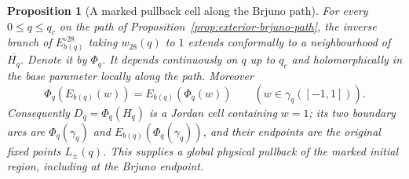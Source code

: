 \documentclass[11pt]{amsart}
\newtheorem{proposition}[theorem]{Proposition}
\theoremstyle{definition}
\begin{document}
\begin{proposition}[A marked pullback cell along the Brjuno path]
\label{prop:exterior-pullback-cell}
For every $0\le q\le q_c$ on the path of
Proposition~\ref{prop:exterior-brjuno-path}, the inverse branch of
$E_{b(q)}^{\circ28}$ taking $w_{28}(q)$ to $1$ extends conformally
to a neighbourhood of $\overline{H_q}$.  Denote it by $\Phi_q$.
It depends continuously on $q$ up to $q_c$ and holomorphically in
the base parameter locally along the path.  Moreover
\[
 \Phi_q(E_{b(q)}(w))=E_{b(q)}(\Phi_q(w))
 \qquad(w\in\gamma_q([-1,1])).
\]
Consequently $D_q=\Phi_q(H_q)$ is a Jordan cell containing $w=1$;
its two boundary arcs are $\Phi_q(\gamma_q)$ and
$E_{b(q)}(\Phi_q(\gamma_q))$, and their endpoints are the original
fixed points $L_\pm(q)$.  This supplies a global physical pullback
of the marked initial region, including at the Brjuno endpoint.
\end{proposition}
\end{document}
